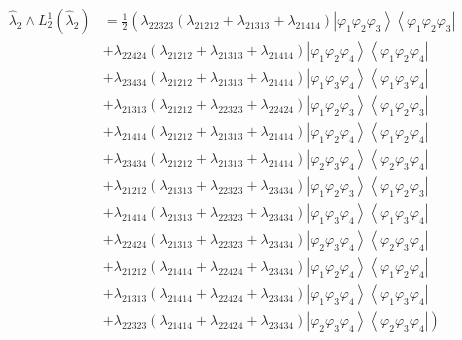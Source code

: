 \documentclass[aps,preprint]{revtex4}%
\begin{document}
\begin{align*}
\hat{\lambda}_{2}\wedge L_{2}^{1}\left(  \hat{\lambda}_{2}\right)   &
=\frac{1}{2}\left(  \lambda_{22323}\left(  \lambda_{21212}+\lambda
_{21313}+\lambda_{21414}\right)  \left\vert \varphi_{1}\varphi_{2}\varphi
_{3}\right\rangle \left\langle \varphi_{1}\varphi_{2}\varphi_{3}\right\vert
\right. \\
&  +\lambda_{22424}\left(  \lambda_{21212}+\lambda_{21313}+\lambda
_{21414}\right)  \left\vert \varphi_{1}\varphi_{2}\varphi_{4}\right\rangle
\left\langle \varphi_{1}\varphi_{2}\varphi_{4}\right\vert \\
&  +\lambda_{23434}\left(  \lambda_{21212}+\lambda_{21313}+\lambda
_{21414}\right)  \left\vert \varphi_{1}\varphi_{3}\varphi_{4}\right\rangle
\left\langle \varphi_{1}\varphi_{3}\varphi_{4}\right\vert \\
&  +\lambda_{21313}\left(  \lambda_{21212}+\lambda_{22323}+\lambda
_{22424}\right)  \left\vert \varphi_{1}\varphi_{2}\varphi_{3}\right\rangle
\left\langle \varphi_{1}\varphi_{2}\varphi_{3}\right\vert \\
&  +\lambda_{21414}\left(  \lambda_{21212}+\lambda_{21313}+\lambda
_{21414}\right)  \left\vert \varphi_{1}\varphi_{2}\varphi_{4}\right\rangle
\left\langle \varphi_{1}\varphi_{2}\varphi_{4}\right\vert \\
&  +\lambda_{23434}\left(  \lambda_{21212}+\lambda_{21313}+\lambda
_{21414}\right)  \left\vert \varphi_{2}\varphi_{3}\varphi_{4}\right\rangle
\left\langle \varphi_{2}\varphi_{3}\varphi_{4}\right\vert \\
&  +\lambda_{21212}\left(  \lambda_{21313}+\lambda_{22323}+\lambda
_{23434}\right)  \left\vert \varphi_{1}\varphi_{2}\varphi_{3}\right\rangle
\left\langle \varphi_{1}\varphi_{2}\varphi_{3}\right\vert \\
&  +\lambda_{21414}\left(  \lambda_{21313}+\lambda_{22323}+\lambda
_{23434}\right)  \left\vert \varphi_{1}\varphi_{3}\varphi_{4}\right\rangle
\left\langle \varphi_{1}\varphi_{3}\varphi_{4}\right\vert \\
&  +\lambda_{22424}\left(  \lambda_{21313}+\lambda_{22323}+\lambda
_{23434}\right)  \left\vert \varphi_{2}\varphi_{3}\varphi_{4}\right\rangle
\left\langle \varphi_{2}\varphi_{3}\varphi_{4}\right\vert \\
&  +\lambda_{21212}\left(  \lambda_{21414}+\lambda_{22424}+\lambda
_{23434}\right)  \left\vert \varphi_{1}\varphi_{2}\varphi_{4}\right\rangle
\left\langle \varphi_{1}\varphi_{2}\varphi_{4}\right\vert \\
&  +\lambda_{21313}\left(  \lambda_{21414}+\lambda_{22424}+\lambda
_{23434}\right)  \left\vert \varphi_{1}\varphi_{3}\varphi_{4}\right\rangle
\left\langle \varphi_{1}\varphi_{3}\varphi_{4}\right\vert \\
&  \left.  +\lambda_{22323}\left(  \lambda_{21414}+\lambda_{22424}%
+\lambda_{23434}\right)  \left\vert \varphi_{2}\varphi_{3}\varphi
_{4}\right\rangle \left\langle \varphi_{2}\varphi_{3}\varphi_{4}\right\vert
\right)
\end{align*}%
\end{document}
